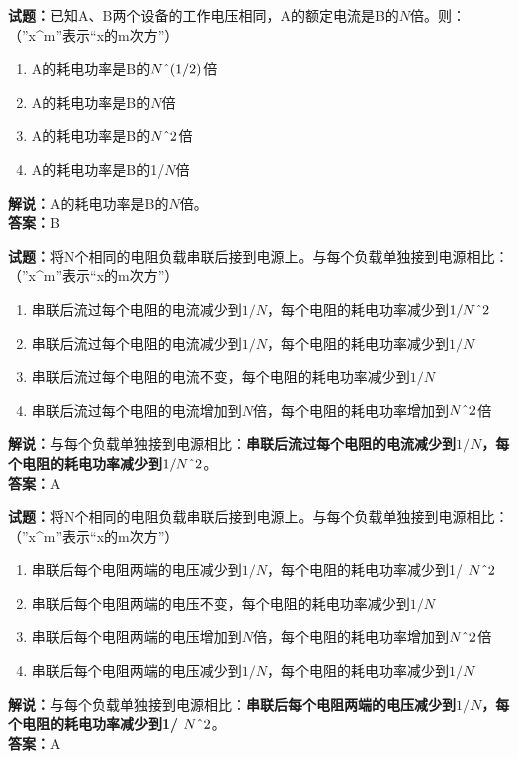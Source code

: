 \documentclass{ctexbook}
\begin{document}
\vspace{1em}

\textbf{试题：}已知A、B两个设备的工作电压相同，A的额定电流是B的\(N\)倍。则：（”x\string^m”表示“x的m次方”）
\begin{enumerate}[leftmargin=3em]
  \item A的耗电功率是B的\(N\string^(1/2)\)倍
  \item A的耗电功率是B的\(N\)倍
  \item A的耗电功率是B的\(N\string^2\)倍
  \item A的耗电功率是B的1/\(N\)倍
\end{enumerate}
\noindent\textbf{解说：}A的耗电功率是B的\(N\)倍。\\
\noindent\textbf{答案：}B

\vspace{1em}

\textbf{试题：}将N个相同的电阻负载串联后接到电源上。与每个负载单独接到电源相比：（”x\string^m”表示“x的m次方”）
\begin{enumerate}[leftmargin=3em]
  \item 串联后流过每个电阻的电流减少到\(1/N\)，每个电阻的耗电功率减少到\(1/N\string^2\)
  \item 串联后流过每个电阻的电流减少到\(1/N\)，每个电阻的耗电功率减少到\(1/N\)
  \item 串联后流过每个电阻的电流不变，每个电阻的耗电功率减少到\(1/N\)
  \item 串联后流过每个电阻的电流增加到\(N\)倍，每个电阻的耗电功率增加到\(N\string^2\)倍
\end{enumerate}
\noindent\textbf{解说：}与每个负载单独接到电源相比：\textbf{串联后流过每个电阻的电流减少到\(1/N\)，每个电阻的耗电功率减少到\(1/N\string^2\)}。\\
\noindent\textbf{答案：}A

\vspace{1em}

\textbf{试题：}将N个相同的电阻负载串联后接到电源上。与每个负载单独接到电源相比：（”x\string^m”表示“x的m次方”）
\begin{enumerate}[leftmargin=3em]
  \item 串联后每个电阻两端的电压减少到\(1/N\)，每个电阻的耗电功率减少到1/ \(N\string^2\)
  \item 串联后每个电阻两端的电压不变，每个电阻的耗电功率减少到\(1/N\)
  \item 串联后每个电阻两端的电压增加到\(N\)倍，每个电阻的耗电功率增加到\(N\string^2\)倍
  \item 串联后每个电阻两端的电压减少到\(1/N\)，每个电阻的耗电功率减少到\(1/N\)
\end{enumerate}
\noindent\textbf{解说：}与每个负载单独接到电源相比：\textbf{串联后每个电阻两端的电压减少到\(1/N\)，每个电阻的耗电功率减少到1/ \(N\string^2\)}。\\\noindent\textbf{答案：}A
\end{document}
